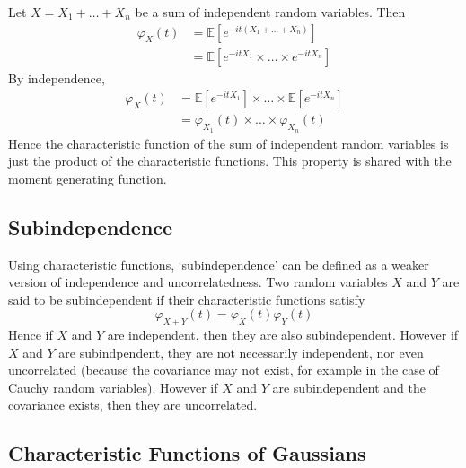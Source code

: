 \documentclass[11pt]{report} %
\begin{document}
Let $X = X_{1} + \dots  + X_{n}$ be a sum of independent random variables. Then
\begin{align}
\varphi_{X}\left(t\right) &= \mathbb{E}\left[e^{-it\left(X_{1} + \dots + X_{n}\right)}\right] \\
&= \mathbb{E}\left[e^{-itX_{1}}\times\dots\times e^{-itX_{n}}\right]
\end{align}
By independence,
\begin{align}
\varphi_{X}\left(t\right) &= \mathbb{E}\left[e^{-itX_{1}}\right]\times\dots\times\mathbb{E}\left[e^{-itX_{n}}\right] \\
&= \varphi_{X_{1}}\left(t\right)\times\dots\times\varphi_{X_{n}}\left(t\right)
\end{align}
Hence the characteristic function of the sum of independent random variables is just the product of the characteristic functions. This property is shared with the moment generating function.

\subsection{Subindependence}

Using characteristic functions, `subindependence' can be defined as a weaker version of independence and uncorrelatedness. Two random variables $X$ and $Y$ are said to be subindependent if their characteristic functions satisfy
\begin{equation}
\varphi_{X+Y}\left(t\right) = \varphi_{X}\left(t\right)\varphi_{Y}\left(t\right)
\end{equation}
Hence if $X$ and $Y$ are independent, then they are also subindependent. However if $X$ and $Y$ are subindpendent, they are not necessarily independent, nor even uncorrelated (because the covariance may not exist, for example in the case of Cauchy random variables). However if $X$ and $Y$ are subindependent and the covariance exists, then they are uncorrelated.

\subsection{Characteristic Functions of Gaussians}
\end{document}
